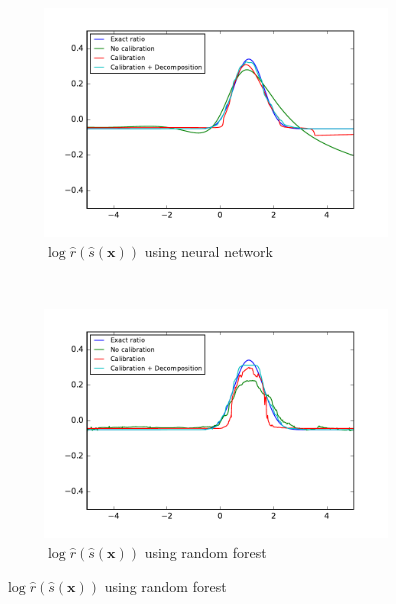 \documentclass[12pt]{article}
\numberwithin{equation}{section}
\theoremstyle{plain}
\begin{document}
\begin{figure}
    \begin{subfigure}[b]{0.4\textwidth}
        \includegraphics[clip, trim=0.5cm 0.5cm 0.5cm 0.5cm,width=\textwidth]{figures/fig1c.pdf}
        \caption{$\log \hat r(\hat{s}(\mathbf{x}))$ using neural network}
        \label{fig:1c}
    \end{subfigure}
    ~
    \begin{subfigure}[b]{0.4\textwidth}
        \includegraphics[clip, trim=0.5cm 0.5cm 0.5cm 0.5cm,width=\textwidth]{figures/fig1d.pdf}
        \caption{$\log \hat r(\hat{s}(\mathbf{x}))$ using random forest}
        \label{fig:1d}
    \end{subfigure}

    \vspace{1em}


\end{figure}
\end{document}

